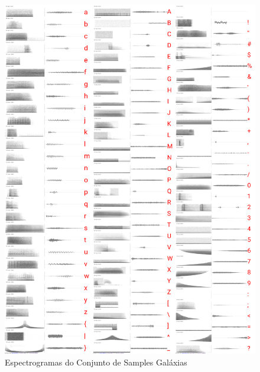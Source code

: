 \begin{description}
\begin{figure}
    \caption{\label{samplesgalaxias}Espectrogramas do Conjunto de Samples Galáxias}
    \begin{center}
        \includegraphics[width=1\linewidth]{pictures/cap3/bandagalaxias.jpg}
    \end{center}
\end{figure}



\end{description}
